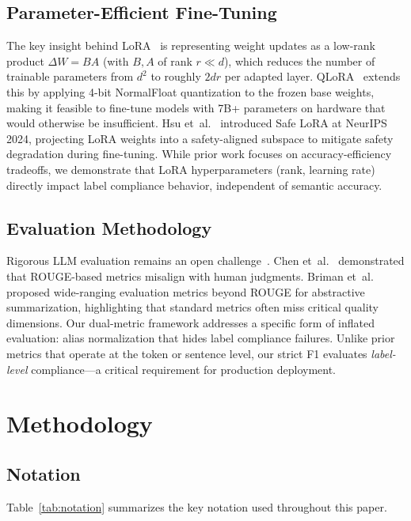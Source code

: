 \documentclass[journal]{IEEEtran}
\begin{document}
\subsection{Parameter-Efficient Fine-Tuning}
The key insight behind LoRA~\cite{hu2022} is representing weight updates as a low-rank product $\Delta W = BA$ (with $B, A$ of rank $r \ll d$), which reduces the number of trainable parameters from $d^2$ to roughly $2dr$ per adapted layer. QLoRA~\cite{dettmers2023} extends this by applying 4-bit NormalFloat quantization to the frozen base weights, making it feasible to fine-tune models with 7B+ parameters on hardware that would otherwise be insufficient. Hsu et~al.~\cite{safelora2024} introduced Safe LoRA at NeurIPS 2024, projecting LoRA weights into a safety-aligned subspace to mitigate safety degradation during fine-tuning. While prior work focuses on accuracy-efficiency tradeoffs, we demonstrate that LoRA hyperparameters (rank, learning rate) directly impact label compliance behavior, independent of semantic accuracy.

\subsection{Evaluation Methodology}
Rigorous LLM evaluation remains an open challenge~\cite{chang2024}. Chen et~al.~\cite{chen2024rouge} demonstrated that ROUGE-based metrics misalign with human judgments. Briman et~al.~\cite{briman2024} proposed wide-ranging evaluation metrics beyond ROUGE for abstractive summarization, highlighting that standard metrics often miss critical quality dimensions. Our dual-metric framework addresses a specific form of inflated evaluation: alias normalization that hides label compliance failures. Unlike prior metrics that operate at the token or sentence level, our strict F1 evaluates \emph{label-level} compliance---a critical requirement for production deployment.

\section{Methodology}

\subsection{Notation}
Table~\ref{tab:notation} summarizes the key notation used throughout this paper.
\end{document}
